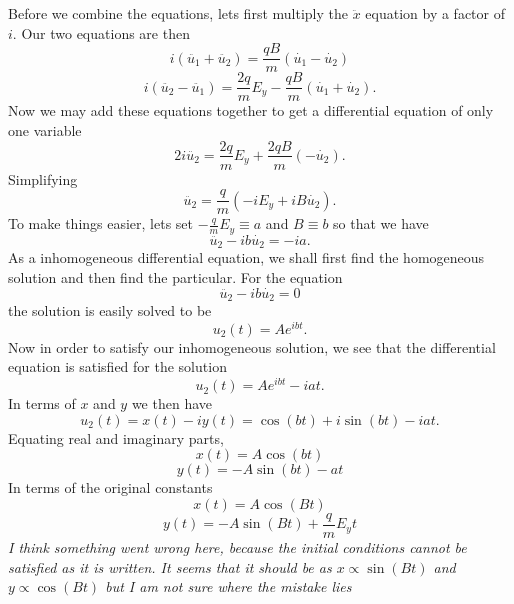 \documentclass[11pt,letterpaper]{article}
\begin{document}
	Before we combine the equations, lets first multiply the $\ddot x$ equation by  a factor of $i$. Our two equations are then
	\[
		i(\ddot{u_1}+\ddot{u_2}) = \frac{qB}{m}(\dot{u_1}-\dot{u_2})
	\]
	\[
		i(\ddot{u_2}-\ddot{u_1}) = \frac{2q}{m}E_y - \frac{qB}{m}(\dot{u_1}+\dot{u_2}).
	\]
	Now we may add these equations together to get a differential equation of only one variable
	\[
		2i\ddot{u_2} = \frac{2q}{m}E_y+\frac{2qB}{m}(-\dot{u_2}).
	\]
	Simplifying
	\[
		\ddot{u_2} = \frac{q}{m}(-iE_y+iB\dot{u_2}).
	\]
	To make things easier, lets set $-\frac{q}{m}E_y \equiv a$ and $B\equiv b$ so that we have
	\[
		\ddot{u_2}-ib\dot{u_2}= -ia.
	\]
	As a inhomogeneous differential equation, we shall first find the homogeneous solution and then find the particular. For the
	equation 
	\[
		\ddot{u_2}-ib\dot{u_2} = 0
	\]
	the solution is easily solved to be 
	\[
		u_2(t) = Ae^{ibt}.
	\]
	Now in order to satisfy our inhomogeneous solution, we see that the differential equation is satisfied for the solution
	\[
		u_2(t) = Ae^{ibt} -iat.
	\]
	In terms of $x$ and $y$ we then have
	\[
		u_2(t)= x(t)-iy(t) = \cos(bt)+i\sin(bt) -iat.
	\]	
	Equating real and imaginary parts,
	\[
		x(t) = A\cos(bt)
	\]
	\[
		y(t) = -A\sin(bt)-at
	\]
	In terms of the original constants
	\[
		x(t) = A\cos(Bt)
	\]
	\[
		y(t) = -A\sin(Bt)+\frac{q}{m}E_yt
	\]
	\emph{I think something went wrong here, because the initial conditions cannot be satisfied as it is written. It seems that
	it should be as $x\propto \sin(Bt)$ and $y\propto\cos(Bt)$ but I am not sure where the mistake lies}
	\eenum
\end{document}
